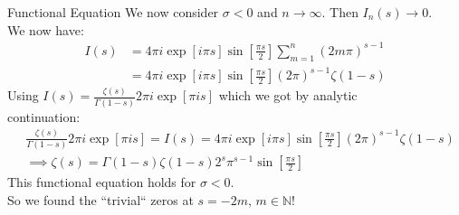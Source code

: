 \documentclass[10pt, dvipsnames]{beamer}
\begin{document}
	\begin{frame}{Functional Equation}
		We now consider $\sigma <0$ and $n\rightarrow \infty$. Then $I_n(s)\rightarrow 0$. \\
		We now have:\vspace{-0.25cm}
		\begin{equation*}
			\begin{split}
				I(s)
				&=4\pi i \exp[i \pi s]\sin\left[\frac{\pi s}{2}\right]\sum_{m=1}^{n}(2m\pi)^{s-1}\\
				&=4\pi i \exp[i \pi s]\sin\left[\frac{\pi s}{2}\right](2\pi)^{s-1}\zeta(1-s)
			\end{split}
		\end{equation*}
		\vspace{-0.1cm}
		\noindent Using $I(s)=\frac{\zeta(s)}{\Gamma(1-s)} 2\pi i\exp[\pi i s]$ which we got by analytic \\
		\hspace{0.05cm} continuation: 
		\begin{equation*}
			\begin{split}
				&  \frac{\zeta(s)}{\Gamma(1-s)} 2\pi i\exp[\pi i s]=I(s)=4\pi i \exp[i \pi s]\sin\left[\frac{\pi s}{2}\right](2\pi)^{s-1}\zeta(1-s)\\
				&\implies \zeta(s)=\Gamma(1-s)\zeta(1-s)2^s\pi^{s-1}\sin\left[\frac{\pi s}{2}\right]
			\end{split}
		\end{equation*}
		\vspace{-0.1cm}
		This functional equation holds for $\sigma <0$.\\
		\hspace{0.05cm}
		So we found the “trivial“ zeros at $s=-2m$, $m\in\mathbb{N}$!
	\end{frame}
\end{document}
